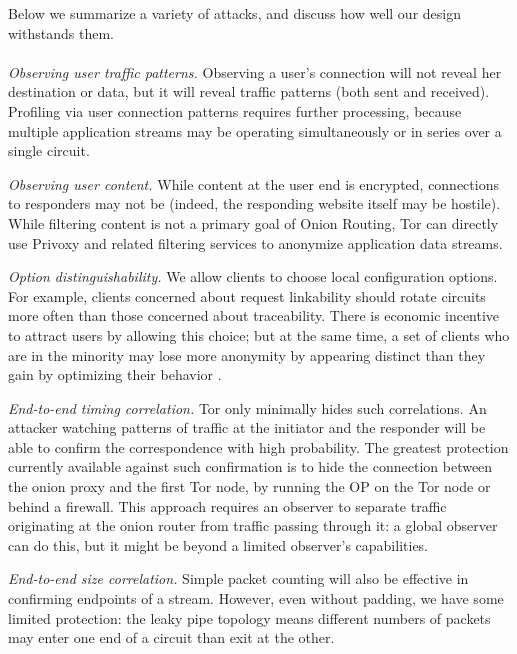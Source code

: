 \documentclass[times,10pt,twocolumn]{article}
\begin{document}
\label{sec:attacks}

Below we summarize a variety of attacks, and discuss how well our
design withstands them.\\

\\
\emph{Observing user traffic patterns.} Observing a user's connection
will not reveal her destination or data, but it will
reveal traffic patterns (both sent and received). Profiling via user
connection patterns requires further processing, because multiple
application streams may be operating simultaneously or in series over
a single circuit.

\emph{Observing user content.} While content at the user end is encrypted,
connections to responders may not be (indeed, the responding website
itself may be hostile). While filtering content is not a primary goal
of Onion Routing, Tor can directly use Privoxy and related
filtering services to anonymize application data streams.

\emph{Option distinguishability.} We allow clients to choose local
configuration options. For example, clients concerned about request
linkability should rotate circuits more often than those concerned
about traceability. There is economic incentive to attract users by
allowing this choice; but at the same time, a set of clients who are
in the minority may lose more anonymity by appearing distinct than they
gain by optimizing their behavior \cite{econymics}.

\emph{End-to-end timing correlation.}  Tor only minimally hides
such correlations. An attacker watching patterns of
traffic at the initiator and the responder will be
able to confirm the correspondence with high probability. The
greatest protection currently available against such confirmation is to hide
the connection between the onion proxy and the first Tor node,
by running the OP on the Tor node or behind a firewall. This approach
requires an observer to separate traffic originating at the onion
router from traffic passing through it: a global observer can do this,
but it might be beyond a limited observer's capabilities.

\emph{End-to-end size correlation.} Simple packet counting
will also be effective in confirming
endpoints of a stream. However, even without padding, we have some
limited protection: the leaky pipe topology means different numbers
of packets may enter one end of a circuit than exit at the other.
\end{document}
